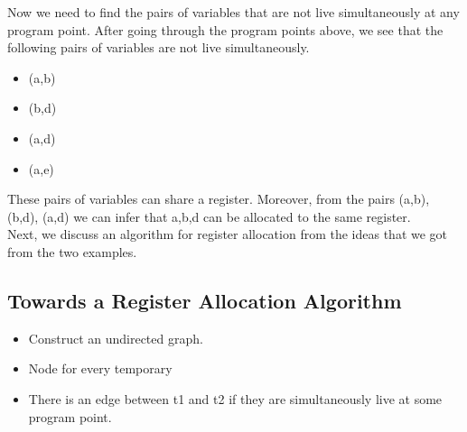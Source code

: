 Now we need to find the pairs of variables that are not live simultaneously at any program point. After going through the program points above, we see that the following pairs of variables are not live simultaneously.
\begin{itemize}
    \item (a,b)
    \item (b,d)
    \item (a,d)
    \item (a,e)
\end{itemize}
These pairs of variables can share a register. Moreover, from the pairs (a,b), (b,d), (a,d) we can infer that a,b,d can be allocated to the same register. \\
Next, we discuss an algorithm for register allocation from the ideas that we got from the two examples.
\subsection{Towards a Register Allocation Algorithm}
\begin{itemize}
    \item Construct an undirected graph.
    \item Node for every temporary
    \item There is an edge between t1 and t2 if they are simultaneously live at some program point.
\end{itemize}


